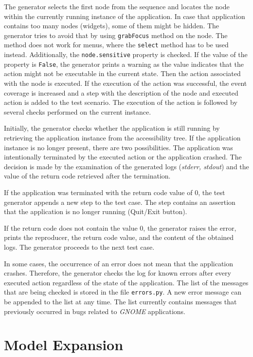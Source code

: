 The generator selects the first node from the sequence and locates the node within the currently running instance of the application. In case that application contains too many nodes (widgets), some of them might be hidden. The generator tries to avoid that by using \texttt{grabFocus} method on the node. The method does not work for menus, where the \texttt{select} method has to be used instead.  Additionally, the \texttt{node.sensitive} property is checked. If the value of the property is \texttt{False}, the generator prints a warning as the value indicates that the action might not be executable in the current state. Then the action associated with the node is executed. If the execution of the action was successful, the event coverage is increased and a step with the description of the node and executed action is added to the test scenario. The execution of the action is followed by several checks performed on the current instance.

Initially, the generator checks whether the application is still running by retrieving the application instance from the accessibility tree. If the application instance is no longer present, there are two possibilities. The application was intentionally terminated by the executed action or the application crashed. The decision is made by the examination of the generated logs (\textit{stderr, stdout}) and the value of the return code retrieved after the termination.

If the application was terminated with the return code value of 0, the test generator appends a new step to the test case. The step contains an assertion that the application is no longer running (Quit/Exit button). 

If the return code does not contain the value 0, the generator raises the error, prints the reproducer, the return code value, and the content of the obtained logs. The generator proceeds to the next test case. 

In some cases, the occurrence of an error does not mean that the application crashes. Therefore, the generator checks the log for known errors after every executed action regardless of the state of the application. The list of the messages that are being checked is stored in the file \texttt{errors.py}. A new error message can be appended to the list at any time. The list currently contains messages that previously occurred in bugs related to \textit{GNOME} applications.

\section{Model Expansion}

